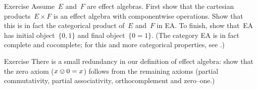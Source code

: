 \documentclass[b]{subfiles}
\begin{document}
\begin{parsec}
\begin{point}{Exercise}%
Assume~$E$ and~$F$ are effect algebras.
First show that the cartesian products~$E \times F$
    is an effect algebra with componentwise operations.
Show that this is in fact the categorical product of~$E$ and~$F$
    in \textsf{EA}.
To finish, show that~\textsf{EA} has initial
    object~$\{0,1\}$
    and final object~$\{0=1\}$.
(The category \textsf{EA} is in fact complete and cocomplete;
    for this and more categorical properties,
        see \cite{corefl}.)
\end{point}

\begin{point}{Exercise}%
There is a small redundancy in our definition of effect algebra:
show that the zero axiom ($x \ovee 0 = x$)
follows from the remaining axioms (partial commutativity,
partial associativity, orthocomplement and zero--one.)
\end{point}


\end{parsec}
\end{document}
